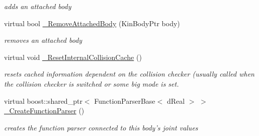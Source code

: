 \begin{DoxyCompactItemize}
\begin{DoxyCompactList}\small\item\em adds an attached body \item\end{DoxyCompactList}\item 
virtual bool \hyperlink{classOpenRAVE_1_1KinBody_a718b569da1eb4373e83434f09b839705}{\_\-RemoveAttachedBody} (KinBodyPtr body)
\begin{DoxyCompactList}\small\item\em removes an attached body \item\end{DoxyCompactList}\item 
\hypertarget{classOpenRAVE_1_1KinBody_ad9a295abdbcfb51c7b9edee54eb805a3}{
virtual void \hyperlink{classOpenRAVE_1_1KinBody_ad9a295abdbcfb51c7b9edee54eb805a3}{\_\-ResetInternalCollisionCache} ()}
\label{classOpenRAVE_1_1KinBody_ad9a295abdbcfb51c7b9edee54eb805a3}

\begin{DoxyCompactList}\small\item\em resets cached information dependent on the collision checker (usually called when the collision checker is switched or some big mode is set. \item\end{DoxyCompactList}\item 
\hypertarget{classOpenRAVE_1_1KinBody_ac739f547d1fd8fc0d58d98b8dfb22083}{
virtual boost::shared\_\-ptr$<$ FunctionParserBase$<$ dReal $>$ $>$ \hyperlink{classOpenRAVE_1_1KinBody_ac739f547d1fd8fc0d58d98b8dfb22083}{\_\-CreateFunctionParser} ()}
\label{classOpenRAVE_1_1KinBody_ac739f547d1fd8fc0d58d98b8dfb22083}

\begin{DoxyCompactList}\small\item\em creates the function parser connected to this body's joint values \item\end{DoxyCompactList}\end{DoxyCompactItemize}
